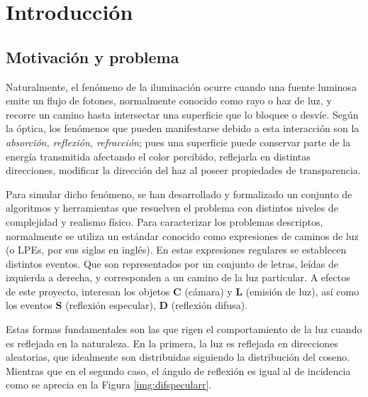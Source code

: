 \chapter{Introducción}
\label{ch:chap01}




\section{Motivación y problema}
\label{sec:motivacionYProblemas}

Naturalmente, el fenómeno de la iluminación ocurre cuando una fuente luminosa emite un flujo de fotones, normalmente conocido como rayo o haz de luz, y recorre un camino hasta intersectar una superficie que lo bloquee o desvíe. Según la óptica, los fenómenos que pueden manifestarse debido a esta interacción son la \textit{absorción, reflexión, refracción}; pues una superficie puede conservar parte de la energía transmitida afectando el color percibido, reflejarla en distintas direcciones, modificar la dirección del haz al poseer propiedades de transparencia.

Para simular dicho fenómeno, se han desarrollado y formalizado un conjunto de algoritmos y herramientas que resuelven el problema con distintos niveles de complejidad y realismo físico. Para caracterizar los problemas descriptos, normalmente se utiliza un estándar conocido como expresiones de caminos de luz \cite{LPE} (o LPEs, por sus siglas en inglés). En estas expresiones regulares se establecen distintos eventos. Que son representados por un conjunto de letras, leídas de izquierda a derecha, y corresponden a un camino de la luz particular. A efectos de este proyecto, interesan los objetos \textbf{C} (cámara) y \textbf{L} (emisión de luz), así como los eventos \textbf{S} (reflexión especular),  \textbf{D} (reflexión difusa).

Estas formas fundamentales son las que rigen el comportamiento de la luz cuando es reflejada en la naturaleza. En la primera, la luz es reflejada en direcciones aleatorias, que idealmente son distribuidas siguiendo la distribución del coseno. Mientras que en el segundo caso, el ángulo de reflexión es igual al de incidencia como se aprecia en la Figura \ref{img:difspecularr}.

